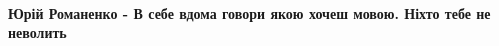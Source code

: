  
 
 
 
 

\paragraph{Юрій Романенко - В себе вдома говори якою хочеш мовою. Ніхто тебе не неволить}
\label{sec:18_06_2020.fb.zharkih_ekaterina.1.mova_jazyk.cmt.romanenko_doma_govori}

